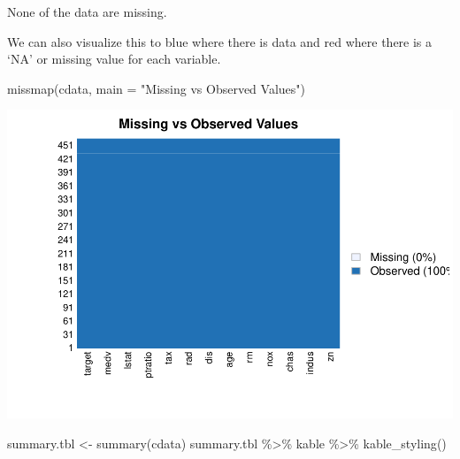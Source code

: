\documentclass[
]{article}
\newenvironment{Shaded}{\begin{snugshade}}{\end{snugshade}}
\newcommand{\AttributeTok}[1]{\textcolor[rgb]{0.77,0.63,0.00}{#1}}
\newcommand{\FunctionTok}[1]{\textcolor[rgb]{0.00,0.00,0.00}{#1}}
\newcommand{\NormalTok}[1]{#1}
\newcommand{\OtherTok}[1]{\textcolor[rgb]{0.56,0.35,0.01}{#1}}
\newcommand{\SpecialCharTok}[1]{\textcolor[rgb]{0.00,0.00,0.00}{#1}}
\newcommand{\StringTok}[1]{\textcolor[rgb]{0.31,0.60,0.02}{#1}}
\begin{document}
None of the data are missing.

We can also visualize this to blue where there is data and red where
there is a `NA' or missing value for each variable.

\begin{Shaded}
\begin{Highlighting}[]
\FunctionTok{missmap}\NormalTok{(cdata, }\AttributeTok{main =} \StringTok{"Missing vs Observed Values"}\NormalTok{)}
\end{Highlighting}
\end{Shaded}

\includegraphics{HW3_files/figure-latex/unnamed-chunk-5-1.pdf}

\begin{Shaded}
\begin{Highlighting}[]
\NormalTok{summary.tbl }\OtherTok{\textless{}{-}} \FunctionTok{summary}\NormalTok{(cdata)}
\NormalTok{summary.tbl }\SpecialCharTok{\%\textgreater{}\%} 
\NormalTok{  kable }\SpecialCharTok{\%\textgreater{}\%} 
  \FunctionTok{kable\_styling}\NormalTok{()}
\end{Highlighting}
\end{Shaded}
\end{document}
